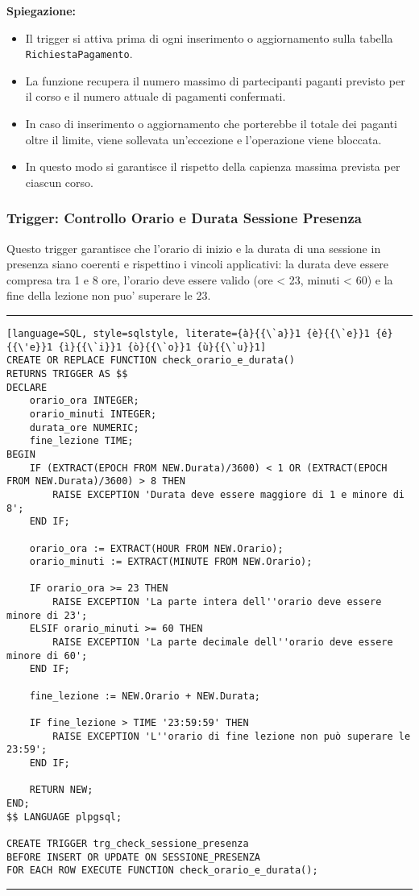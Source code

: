 \textbf{Spiegazione:}
\begin{itemize}
    \item Il trigger si attiva prima di ogni inserimento o aggiornamento sulla tabella \texttt{RichiestaPagamento}.
    \item La funzione recupera il numero massimo di partecipanti paganti previsto per il corso e il numero attuale di pagamenti confermati.
    \item In caso di inserimento o aggiornamento che porterebbe il totale dei paganti oltre il limite, viene sollevata un'eccezione e l'operazione viene bloccata.
    \item In questo modo si garantisce il rispetto della capienza massima prevista per ciascun corso.
\end{itemize}

\subsubsection{Trigger: Controllo Orario e Durata Sessione Presenza}

Questo trigger garantisce che l'orario di inizio e la durata di una sessione in presenza siano coerenti e rispettino i vincoli applicativi: la durata deve essere compresa tra 1 e 8 ore, l'orario deve essere valido (ore < 23, minuti < 60) e la fine della lezione non puo' superare le 23.

\noindent\rule{\textwidth}{0.4pt}
\begin{lstlisting}[language=SQL, style=sqlstyle, literate={à}{{\`a}}1 {è}{{\`e}}1 {é}{{\'e}}1 {ì}{{\`i}}1 {ò}{{\`o}}1 {ù}{{\`u}}1]
CREATE OR REPLACE FUNCTION check_orario_e_durata()
RETURNS TRIGGER AS $$
DECLARE
    orario_ora INTEGER;
    orario_minuti INTEGER;
    durata_ore NUMERIC;
    fine_lezione TIME;
BEGIN
    IF (EXTRACT(EPOCH FROM NEW.Durata)/3600) < 1 OR (EXTRACT(EPOCH FROM NEW.Durata)/3600) > 8 THEN
        RAISE EXCEPTION 'Durata deve essere maggiore di 1 e minore di 8';
    END IF;

    orario_ora := EXTRACT(HOUR FROM NEW.Orario);
    orario_minuti := EXTRACT(MINUTE FROM NEW.Orario);

    IF orario_ora >= 23 THEN
        RAISE EXCEPTION 'La parte intera dell''orario deve essere minore di 23';
    ELSIF orario_minuti >= 60 THEN
        RAISE EXCEPTION 'La parte decimale dell''orario deve essere minore di 60';
    END IF;

    fine_lezione := NEW.Orario + NEW.Durata;

    IF fine_lezione > TIME '23:59:59' THEN
        RAISE EXCEPTION 'L''orario di fine lezione non può superare le 23:59';
    END IF;

    RETURN NEW;
END;
$$ LANGUAGE plpgsql;

CREATE TRIGGER trg_check_sessione_presenza
BEFORE INSERT OR UPDATE ON SESSIONE_PRESENZA
FOR EACH ROW EXECUTE FUNCTION check_orario_e_durata();
\end{lstlisting}
\noindent\rule{\textwidth}{0.4pt}

